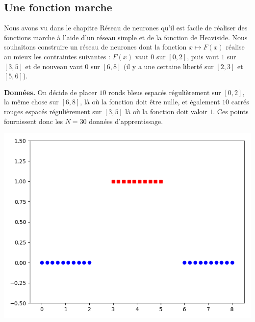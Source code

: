{\begin{itemize}
\end{itemize}



\subsection{Une fonction marche}

Nous avons vu dans le chapitre  \og{}Réseau de neurones\fg{} qu'il est facile de réaliser des fonctions \og{}marche\fg{} à l'aide d'un réseau simple et de la fonction de Heaviside.
Nous souhaitons construire un réseau de neurones dont la fonction $x \mapsto F(x)$ réalise au mieux les contraintes suivantes : $F(x)$ vaut $0$ sur $[0,2]$, puis vaut $1$ sur $[3,5]$ et de nouveau vaut
$0$ sur $[6,8]$ (il y a une certaine liberté sur $[2,3]$ et $[5,6]$).


\bigskip

\textbf{Données.}
On décide de placer $10$ ronds bleus espacés régulièrement sur $[0,2]$, la même chose sur 
$[6,8]$, là où la fonction doit être nulle, et également $10$ carrés rouges espacés régulièrement sur $[3,5]$ là où la fonction doit valoir $1$. Ces points fournissent donc les $N=30$ données d'apprentissage. 

\begin{center}
	\includegraphics[scale=\myscale,scale=0.4]{figures/retro_03_a}
\end{center}

\bigskip

}
